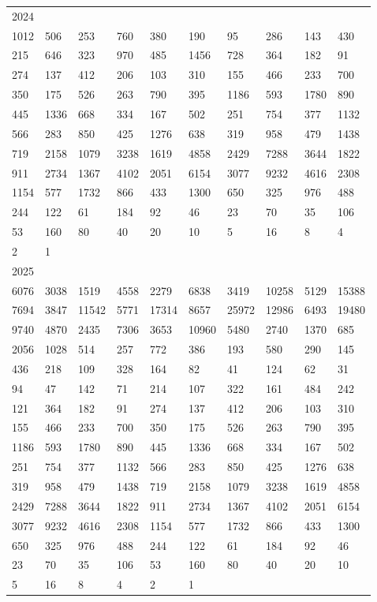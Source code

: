 \begin{longtable}{*{10}{l}}
2024&&&&&&&&&\\
1012& 506& 253& 760& 380& 190& 95& 286& 143& 430\\
215& 646& 323& 970& 485& 1456& 728& 364& 182& 91\\
274& 137& 412& 206& 103& 310& 155& 466& 233& 700\\
350& 175& 526& 263& 790& 395& 1186& 593& 1780& 890\\
445& 1336& 668& 334& 167& 502& 251& 754& 377& 1132\\
566& 283& 850& 425& 1276& 638& 319& 958& 479& 1438\\
719& 2158& 1079& 3238& 1619& 4858& 2429& 7288& 3644& 1822\\
911& 2734& 1367& 4102& 2051& 6154& 3077& 9232& 4616& 2308\\
1154& 577& 1732& 866& 433& 1300& 650& 325& 976& 488\\
244& 122& 61& 184& 92& 46& 23& 70& 35& 106\\
53& 160& 80& 40& 20& 10& 5& 16& 8& 4\\
2& 1& \\

2025&&&&&&&&&\\
6076& 3038& 1519& 4558& 2279& 6838& 3419& 10258& 5129& 15388\\
7694& 3847& 11542& 5771& 17314& 8657& 25972& 12986& 6493& 19480\\
9740& 4870& 2435& 7306& 3653& 10960& 5480& 2740& 1370& 685\\
2056& 1028& 514& 257& 772& 386& 193& 580& 290& 145\\
436& 218& 109& 328& 164& 82& 41& 124& 62& 31\\
94& 47& 142& 71& 214& 107& 322& 161& 484& 242\\
121& 364& 182& 91& 274& 137& 412& 206& 103& 310\\
155& 466& 233& 700& 350& 175& 526& 263& 790& 395\\
1186& 593& 1780& 890& 445& 1336& 668& 334& 167& 502\\
251& 754& 377& 1132& 566& 283& 850& 425& 1276& 638\\
319& 958& 479& 1438& 719& 2158& 1079& 3238& 1619& 4858\\
2429& 7288& 3644& 1822& 911& 2734& 1367& 4102& 2051& 6154\\
3077& 9232& 4616& 2308& 1154& 577& 1732& 866& 433& 1300\\
650& 325& 976& 488& 244& 122& 61& 184& 92& 46\\
23& 70& 35& 106& 53& 160& 80& 40& 20& 10\\
5& 16& 8& 4& 2& 1& \\


\end{longtable}
